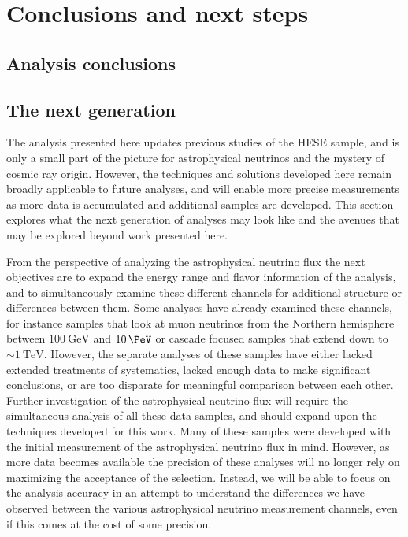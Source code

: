 \chapter{Conclusions and next steps\label{chapter:conclusions}}
\section{Analysis conclusions\label{sec:analysis_conclusions}}
\begingroup
\graphicspath{{results/HESE_Final_Paper/}}

\endgroup
\FloatBarrier

\section{The next generation}
The analysis presented here updates previous studies of the HESE sample, and is only a small part of the picture for astrophysical neutrinos and the mystery of cosmic ray origin.
However, the techniques and solutions developed here remain broadly applicable to future analyses, and will enable more precise measurements as more data is accumulated and additional samples are developed.
This section explores what the next generation of analyses may look like and the avenues that may be explored beyond work presented here.

From the perspective of analyzing the astrophysical neutrino flux the next objectives are to expand the energy range and flavor information of the analysis, and to simultaneously examine these different channels for additional structure or differences between them.
Some analyses have already examined these channels, for instance samples that look at muon neutrinos from the Northern hemisphere between $\SI{100}\GeV$ and $\SI{10}\PeV$ or cascade focused samples that extend down to $\sim\SI{1}\TeV$.
However, the separate analyses of these samples have either lacked extended treatments of systematics, lacked enough data to make significant conclusions, or are too disparate for meaningful comparison between each other.
Further investigation of the astrophysical neutrino flux will require the simultaneous analysis of all these data samples, and should expand upon the techniques developed for this work.
Many of these samples were developed with the initial measurement of the astrophysical neutrino flux in mind.
However, as more data becomes available the precision of these analyses will no longer rely on maximizing the acceptance of the selection.
Instead, we will be able to focus on the analysis accuracy in an attempt to understand the differences we have observed between the various astrophysical neutrino measurement channels, even if this comes at the cost of some precision.

